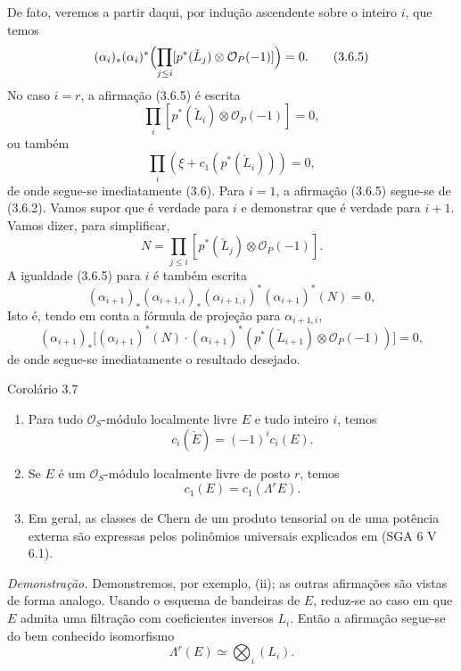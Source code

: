 De fato, veremos a partir daqui, por indução ascendente sobre o inteiro $i$, que temos
\[
(\alpha_i)_*(\alpha_i)^*\Bigl(\prod_{j\le i}[p^*(\check L_j)\otimes\mathcal O_P(-1)]\Bigr)=0.
\tag{3.6.5}
\]
No caso $i=r$, a afirmação (3.6.5) é escrita
\[
\prod_i[p^*(\check L_i)\otimes\mathcal O_P(-1)]=0,
\]
ou também
\[
\prod_i(\xi+c_1(p^*(\check L_i)))=0,
\]
de onde segue-se imediatamente (3.6). Para $i=1$, a afirmação (3.6.5) segue-se de (3.6.2). Vamos supor que é verdade para $i$ e demonstrar que é verdade para $i+1$. Vamos dizer, para simplificar,
\[
N=\prod_{j\le i}[p^*(\check L_j)\otimes\mathcal O_P(-1)].
\]
A igualdade (3.6.5) para $i$ é também escrita
\[
(\alpha_{i+1})_*(\alpha_{i+1,i})_*(\alpha_{i+1,i})^*(\alpha_{i+1})^*(N)=0,
\]
Isto é, tendo em conta a fórmula de projeção para $\alpha_{i+1,i}$,
\[
(\alpha_{i+1})_*\bigl[(\alpha_{i+1})^*(N)\cdot(\alpha_{i+1})^*(p^*(\check L_{i+1})\otimes\mathcal O_P(-1))\bigr]=0,
\]
de onde segue-se imediatamente o resultado desejado.

\begin{statement}{Corolário 3.7}
\begin{enumerate}[label=(\roman*)]
\item Para tudo $\mathcal O_S$-módulo localmente livre $E$ e tudo inteiro $i$, temos
\[
c_i(\check E)=(-1)^i c_i(E).
\]
\item Se $E$ é um $\mathcal O_S$-módulo localmente livre de posto $r$, temos
\[
c_1(E)=c_1(\Lambda^rE).
\]
\item Em geral, as classes de Chern de um produto tensorial ou de uma potência externa são expressas pelos polinômios universais explicados em (SGA 6 V 6.1).
\end{enumerate}
\end{statement}

\emph{Demonstração.} Demonstremos, por exemplo, (ii); as outras afirmações são vistas de forma analogo. Usando o esquema de bandeiras de $E$, reduz-se ao caso em que $E$ admita uma filtração com coeficientes inversos $L_i$. Então a afirmação segue-se do bem conhecido isomorfismo
\[
\Lambda^r(E)\simeq\bigotimes_i (L_i).
\]
